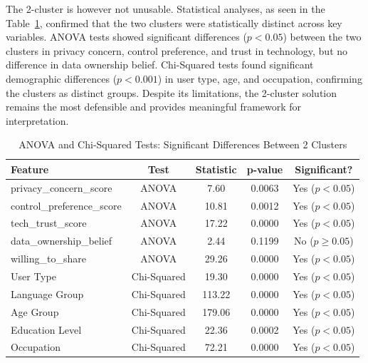 	The 2-cluster is however not unusable. Statistical analyses, as seen in the Table~\ref{tab:cluster_significance}, confirmed that the two clusters were statistically distinct across key variables. ANOVA tests showed significant differences ($p < 0.05$) between the two clusters in privacy concern, control preference, and trust in technology, but no difference in data ownership belief. Chi-Squared tests found significant demographic differences ($p < 0.001$) in user type, age, and occupation, confirming the clusters as distinct groups. Despite its limitations, the 2-cluster solution remains the most defensible and provides meaningful framework for interpretation.
	\begin{table}[ht]
		\caption{ANOVA and Chi-Squared Tests: Significant Differences Between 2 Clusters}
		\centering
		\begin{tabular}{lcccc}
			\toprule
			\textbf{Feature} & \textbf{Test} & \textbf{Statistic} & \textbf{p-value} & \textbf{Significant?} \\
			\midrule
			privacy\_concern\_score    & ANOVA        & 7.60      & 0.0063  & Yes ($p < 0.05$) \\
			control\_preference\_score & ANOVA        & 10.81     & 0.0012  & Yes ($p < 0.05$) \\
			tech\_trust\_score         & ANOVA        & 17.22     & 0.0000  & Yes ($p < 0.05$) \\
			data\_ownership\_belief    & ANOVA        & 2.44      & 0.1199  & No ($p \geq 0.05$) \\
			willing\_to\_share         & ANOVA        & 29.26     & 0.0000  & Yes ($p < 0.05$) \\
			\midrule
			User Type                  & Chi-Squared  & 19.30     & 0.0000  & Yes ($p < 0.05$) \\
			Language Group             & Chi-Squared  & 113.22    & 0.0000  & Yes ($p < 0.05$) \\
			Age Group                  & Chi-Squared  & 179.06    & 0.0000  & Yes ($p < 0.05$) \\
			Education Level            & Chi-Squared  & 22.36     & 0.0002  & Yes ($p < 0.05$) \\
			Occupation                 & Chi-Squared  & 72.21     & 0.0000  & Yes ($p < 0.05$) \\
			\bottomrule
		\end{tabular}
		\label{tab:cluster_significance}
	\end{table}
